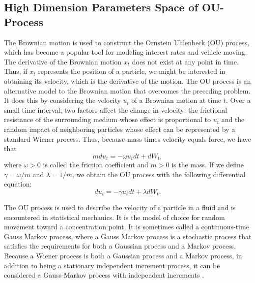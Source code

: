 \subsection{High Dimension Parameters Space of OU-Process}

The Brownian motion is used to construct the Ornstein Uhlenbeck (OU) process, which has become a popular tool for modeling interest rates and vehicle moving. The derivative of the Brownian motion $x_t$ does not exist at any point in time. Thus, if $x_t$ represents the position of a particle, we might be interested in
obtaining its velocity, which is the derivative of the motion. The OU process is an alternative model to the Brownian motion that overcomes the preceding problem.
It does this by considering the velocity $u_t$ of a Brownian motion at time $t$. Over a small time interval, two factors affect the change in velocity: the frictional
resistance of the surrounding medium whose effect is proportional to $u_t$ and the random impact of neighboring particles whose effect can be represented
by a standard Wiener process. Thus, because mass times velocity equals force, we have that
\begin{equation*}
mdu_t = -\omega u_tdt+dW_t,
\end{equation*}
where $\omega>0$ is called the friction coefficient and $m>0$ is the mass. If we define $\gamma = \omega /m$ and $\lambda = 1/m$, we obtain the OU process with the following differential
equation:
\begin{equation}
du_t= -\gamma u_tdt+\lambda dW_t.
\end{equation}

The OU process is used to describe the velocity of a particle in a fluid and is encountered in statistical mechanics. It is the model of choice for random movement
toward a concentration point. It is sometimes called a continuous-time Gauss Markov process, where a Gauss Markov process is a stochastic process
that satisfies the requirements for both a Gaussian process and a Markov process. Because a Wiener process is both a Gaussian process and a Markov process, in addition to being a stationary independent increment process, it can be considered a Gauss-Markov process with independent increments \cite{kijima1997markov}.

